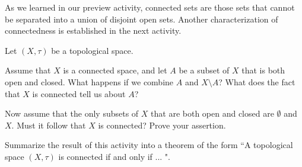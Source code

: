 \begin{comment}
\item Notice that $[1, 2] = (0, 2.5) \cap X$ and $(3, 4) = (3, 4) \cap X$, so both $[1, 2]$ and $(3, 4)$ are open in $X$. Then $X$ can be written as a disjoint union of nonempty proper open sets as $X = [1, 2] \cup (3, 4)$.

\begin{figure}[h]
\begin{center}
\resizebox{!}{2.5in}{\texttt{[image: PA\_18\_1.eps]}}
\caption{The set $O$.} 
\label{F:PA_18_1}
\end{center}
\end{figure}

\item  Let $Q_1 = \{(x, y) \ \mid| \  x > 0 \text{ and } y > 0\}$ and let $Q_4 = \{(x, y) \ \mid| \  x < 0 \text{ and } y < 0\}$. Then $Q_1$ and $Q_4$ are open sets in $\R^2$, so $O_1 = Q_1 \cap A$ and $O_2 = Q_4 \cap A$ are relatively open in $A$. Note that $O_1$ is the portion of the graph of $y = \frac{1}{x}$ in the first quadrant and $O_2$ is the portion of the graph of $y = \frac{1}{x}$ in the fourth quadrant. Now let 
\[O = \left\{(x,y) \mid |x| < 1 \text{ and } |y| < \frac{1}{4}, |x| \geq 1 \text{ and } y < \frac{1}{x^2}\right\}\]
as illustrated in Figure \ref{F:PA_18_1}. Note that $O \cap A$ is the line $y=0$. 

Now let $U = O_1 \cup O_2$ and $V = O \cap A$. Then $U$ and $V$ are nonempty open sets in $A$. Since all of the points in $V$ satisfy $y = 0$ and none of the points in $U$ have $y = 0$, we see that $U \cap V = \emptyset$. So $A$ is disconnected.


\ee

\end{comment}



As we learned in our preview activity, connected sets are those sets that cannot be separated into a union of disjoint open sets. Another characterization of connectedness is established in the next activity.

\begin{activity} Let $(X, \tau)$ be a topological space.
\ba
\item Assume that $X$ is a connected space, and let $A$ be a subset of $X$ that is both open and closed. What happens if we combine $A$ and $X \setminus A$? What does the fact that $X$ is connected tell us about $A$?  

\item Now assume that the only subsets of $X$ that are both open and closed are $\emptyset$ and $X$. Must it follow that $X$ is connected? Prove your assertion. 

\item Summarize the result of this activity into a theorem of the form ``A topological space $(X, \tau)$ is connected if and only if ... ".

\ea
\end{activity} 

